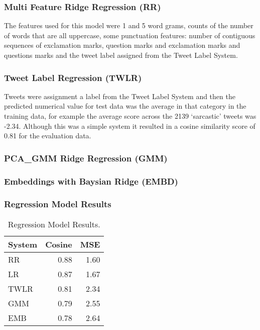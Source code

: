 \documentclass[11pt,letterpaper]{article}
\begin{document}
\subsubsection{Multi Feature Ridge Regression (RR)}
The features used for this model were 1 and 5 word grams, counts of the number of words that are all uppercase, some punctuation features: number of contiguous sequences of exclamation marks, question marks and exclamation marks and questions marks and the tweet label assigned from the Tweet Label System.

\subsubsection{Tweet Label Regression (TWLR)}
Tweets were assignment a label from the Tweet Label System and then the predicted numerical value for test data was the average in that category in the training data, for example the average score across the 2139 `sarcastic' tweets was -2.34. Although this was a simple system it resulted in a cosine similarity score of 0.81 for the evaluation data.

\subsubsection{PCA\_GMM Ridge Regression (GMM)}

\subsubsection{Embeddings with Baysian Ridge (EMBD)}

\subsubsection{Regression Model Results}
\begin{table}[ht!]
\begin{tabular}{|l|r|r|}
\hline
System & Cosine & MSE\\
\hline
RR & 0.88 & 1.60\\
LR & 0.87 &1.67\\
TWLR & 0.81 & 2.34\\
GMM & 0.79  & 2.55\\
EMB & 0.78 & 2.64\\
\hline
\end{tabular}
\caption{Regression Model Results.}
\label{tbl:regressionResults}
\end{table}
\end{document}
